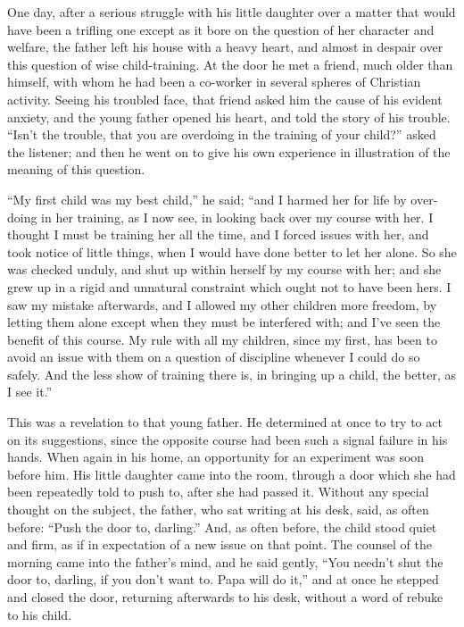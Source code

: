 \documentclass[
]{book}
\begin{document}
One day, after a serious struggle with his little daughter over a matter that would have been a trifling one except as it bore on the question of her character and welfare, the father left his house with a heavy heart, and almost in despair over this question of wise child-training. At the door he met a friend, much older than himself, with whom he had been a co-worker in several spheres of Christian activity. Seeing his troubled face, that friend asked him the cause of his evident anxiety, and the young father opened his heart, and told the story of his trouble. ``Isn't the trouble, that you are overdoing in the training of your child?'' asked the listener; and then he went on to give his own experience in illustration of the meaning of this question.

``My first child was my best child,'' he said; ``and I harmed her for life by over-doing in her training, as I now see, in looking back over my course with her. I thought I must be training her all the time, and I forced issues with her, and took notice of little things, when I would have done better to let her alone. So she was checked unduly, and shut up within herself by my course with her; and she grew up in a rigid and unnatural constraint which ought not to have been hers. I saw my mistake afterwards, and I allowed my other children more freedom, by letting them alone except when they must be interfered with; and I've seen the benefit of this course. My rule with all my children, since my first, has been to avoid an issue with them on a question of discipline whenever I could do so safely. And the less show of training there is, in bringing up a child, the better, as I see it.''

This was a revelation to that young father. He determined at once to try to act on its suggestions, since the opposite course had been such a signal failure in his hands. When again in his home, an opportunity for an experiment was soon before him. His little daughter came into the room, through a door which she had been repeatedly told to push to, after she had passed it. Without any special thought on the subject, the father, who sat writing at his desk, said, as often before: ``Push the door to, darling.'' And, as often before, the child stood quiet and firm, as if in expectation of a new issue on that point. The counsel of the morning came into the father's mind, and he said gently, ``You needn't shut the door to, darling, if you don't want to. Papa will do it,'' and at once he stepped and closed the door, returning afterwards to his desk, without a word of rebuke to his child.
\end{document}

